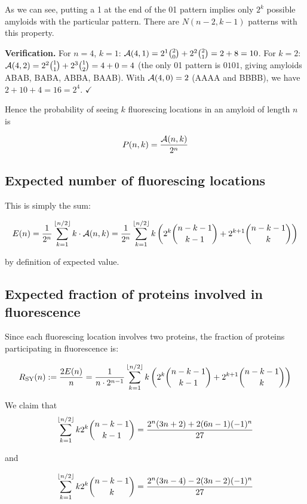 \documentclass[11pt]{article}
\DeclarePairedDelimiter\floor{\lfloor}{\rfloor}
\newcommand{\cA}{ {\cal A} }
\begin{document}
As we can see, putting a 1 at the end of the 01 pattern implies only $2^k$ possible amyloids with the particular pattern. There are $N(n-2, k - 1)$ patterns with this property.

\textbf{Verification.} For $n = 4$, $k = 1$: $\cA(4,1) = 2^1 \binom{2}{0} + 2^2 \binom{2}{1} = 2 + 8 = 10$. For $k = 2$: $\cA(4,2) = 2^2 \binom{1}{1} + 2^3 \binom{1}{2} = 4 + 0 = 4$ (the only 01 pattern is $0101$, giving amyloids ABAB, BABA, ABBA, BAAB). With $\cA(4,0) = 2$ (AAAA and BBBB), we have $2 + 10 + 4 = 16 = 2^4$. $\checkmark$

Hence the probability of seeing $k$ fluorescing locations in an amyloid of length $n$ is

\[
P(n,k) = \frac{\cA(n,k)}{2^n}
\]

\subsection{Expected number of fluorescing locations}

This is simply the sum:

\[
    E(n) = \frac{1}{2^n}\sum_{k=1}^{\floor{n/2}} k \cdot \cA(n,k) = \frac{1}{2^n}\sum_{k=1}^{\floor{n/2}} k \left( 2^k \binom{n-k-1}{k-1} + 2^{k+1} \binom{n-k-1}{k} \right)
\]

by definition of expected value.

\subsection{Expected fraction of proteins involved in fluorescence}\label{subsec:sy-ratio}

Since each fluorescing location involves two proteins, the fraction of proteins participating in fluorescence is:

\[
    R_{\text{SY}}(n) := \frac{2E(n)}{n} = \frac{1}{n \cdot 2^{n-1}}\sum_{k=1}^{\floor{n/2}} k \left( 2^k \binom{n-k-1}{k-1} + 2^{k+1} \binom{n-k-1}{k} \right)
\]

We claim that
\begin{equation}\label{eq:sum1}
\sum_{k=1}^{\floor{n/2}} k 2^k \binom{n-k-1}{k-1} = \frac{2^n (3n+2) + 2(6n-1)(-1)^n}{27}
\end{equation}

and

\begin{equation}\label{eq:sum2}
\sum_{k=1}^{\floor{n/2}} k 2^k \binom{n-k-1}{k} = \frac{2^n (3n-4)-2(3n-2)(-1)^n}{27}
\end{equation}
\end{document}

